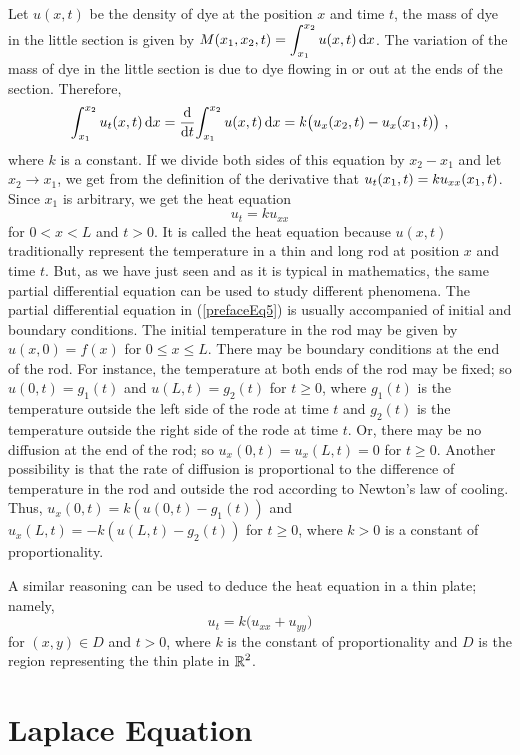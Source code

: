 Let $u(x,t)$ be the density of dye at the position $x$ and time $t$,
the mass of dye in the little section is given by
$\DS M(x_1,x_2,t) = \int_{x_1}^{x_2} u(x,t) \dx{x}$.
The variation of the mass of dye in the little section is
due to dye flowing in or out at the ends of the section.  Therefore,
\[
  \int_{x_1}^{x_2} u_t(x,t) \dx{x} 
= \dfdx{\int_{x_1}^{x_2} u(x,t) \dx{x}}{t} 
= k \big( u_x(x_2,t) - u_x(x_1,t) \big) \ ,
\]
where $k$ is a constant.  If we divide both sides of this equation by
$x_2-x_1$ and let $x_2 \to x_1$, we get from the definition of the
derivative that $\DS u_t(x_1,t) = k u_{xx}(x_1,t)$.
Since $x_1$ is arbitrary, we get the heat equation
\[
  u_t = k u_{xx} \tag{5} \label{prefaceEq5}
\]
for $0 < x < L$ and $t > 0$.  It is called the heat equation because
$u(x,t)$ traditionally represent the temperature in a thin and long
rod at position $x$ and time $t$.  But, as we have just seen and as it
is typical in mathematics, the same partial differential equation can
be used to study different phenomena. The partial differential
equation in (\ref{prefaceEq5}) is usually accompanied of initial and
boundary conditions.   The initial temperature in the rod may be given
by $u(x,0) = f(x)$ for $0 \leq x \leq L$.  There may be boundary
conditions at the end of the rod.  For instance, the temperature at
both ends of the rod may be fixed; so $u(0,t) = g_1(t)$ and
$u(L,t) = g_2(t)$ for $t \geq 0$, where $g_1(t)$ is the temperature
outside the left side of the rode at time $t$ and $g_2(t)$ is the temperature
outside the right side of the rode at time $t$.  Or, there may be no
diffusion at the end of the rod; so $u_x(0,t) = u_x(L,t) = 0$ for
$t \geq 0$.  Another possibility is that
the rate of diffusion is proportional to the difference of temperature
in the rod and outside the rod according to Newton's law of cooling.
Thus, $u_x(0,t) = k (u(0,t) - g_1(t))$ and 
$u_x(L,t) = -k (u(L,t) - g_2(t))$ for $t \geq 0$, where $k>0$ is a
constant of proportionality.

A similar reasoning can be used to deduce the heat equation in a thin
plate; namely,
\[
u_t = k \big( u_{xx} + u_{yy} \big)
\]
for $(x,y) \in D$ and $t > 0$, where $k$ is the constant of
proportionality and $D$ is the region representing the thin plate in
$\DS \RR^2$.

\section*{Laplace Equation}

